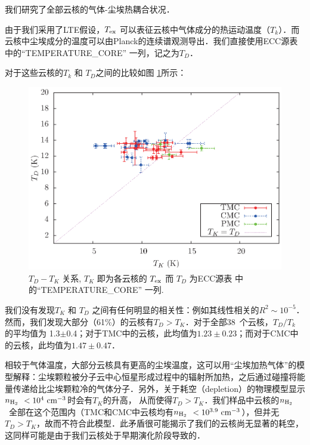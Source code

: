 \documentclass[UTF8, nocolorlinks]{pkuthss}
\newcommand{\texc}{$T_{\rm {ex}}$ }
\newcommand{\nnhyd}{$n_{\rm H_2}$\ }
\newcommand{\numcore}{38\ }
\begin{document}
		我们研究了全部云核的气体-尘埃热耦合状况．

		由于我们采用了LTE假设，\texc 可以表征云核中气体成分的热运动温度（$T_k$）．而云核中尘埃成分的温度可以由Planck的连续谱观测导出．我们直接使用ECC源表中的“TEMPERATURE\_CORE” 一列\supercite{2011yCat.8088....0P}，记之为$T_D$．

		对于这些云核的$T_k$ 和 $T_D$之间的比较如图 \ref{Fig.GasDust}所示：
		
		\begin{figure}[htbp]
		\begin{center}
			\includegraphics[totalheight=62mm]{img_plot/Gas-Dust_EB_Core.eps}
			\caption{$T_D-T_K$ 关系, $T_K$ 即为各云核的 \texc 而 $T_D$ 为ECC源表\supercite{2011yCat.8088....0P} 中的“TEMPERATURE\_CORE” 一列.\label{Fig.GasDust}}
		\end{center}
		\end{figure}
		
		我们没有发现$T_K$ 和 $T_D$ 之间有任何明显的相关性：例如其线性相关的$R^2\sim 10^{-5}$． 然而，我们发现大部分（61\%）的云核有$T_D>T_K$．对于全部\numcore 个云核，$T_D/T_k$ 的平均值为 1.3$\pm$0.4；对于TMC中的云核，此均值为$1.23\pm0.23$；而对于CMC中的云核，此均值为$1.47\pm0.47$．

		相较于气体温度，大部分云核具有更高的尘埃温度，这可以用“尘埃加热气体”的模型解释：尘埃颗粒被分子云中心恒星形成过程中的辐射所加热，之后通过碰撞将能量传递给比尘埃颗粒冷的气体分子\supercite{1974ApJ...189..441G}．另外，关于耗空（depletion）的物理模型\supercite{2001ApJ...557..736G}显示\nnhyd $<10^{4}\rm\ cm^{-3}$时会有$T_K$的升高， 从而使得$T_D>T_K$．我们样品中云核的\nnhyd 全部在这个范围内（TMC和CMC中云核均有\nnhyd $<10^{3.9}\rm\ cm^{-3}$），但并无$T_D>T_K$，故而不符合此模型．此矛盾很可能揭示了我们的云核尚无显著的耗空，这同样可能是由于我们云核处于早期演化阶段导致的．
\end{document}
